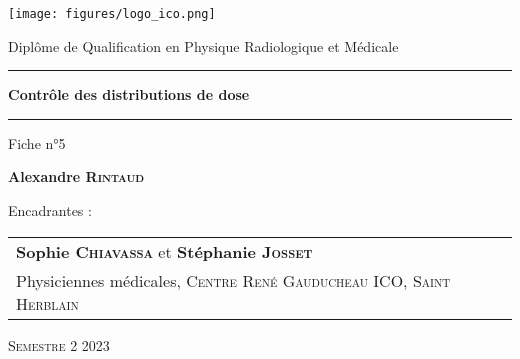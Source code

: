 \begin{titlepage}

    \unitlength 1cm
    \begin{center}
    
    \vspace*{1cm}

    \texttt{[image: figures/logo\_ico.png]}
    
    \vspace{2cm}
    
               {\Large Diplôme de Qualification en Physique Radiologique et Médicale\\}
               
    \vspace{2cm}           
    
    
    \rule{16cm}{0.7pt}
    
    \vspace{12pt}
               
               {\LARGE \bf Contrôle des distributions de dose\\}
               
    \vspace{12pt}
    \rule{16cm}{0.7pt}

    \vspace{2cm}

                {\large Fiche n°5}
    
    \vspace{1.5cm}

               {\Large\bf {Alexandre \textsc{Rintaud}}}
    
    \vspace{1.5cm}
    
    \end{center}
    
    Encadrantes :
    
    \small {
    \begin{tabular}{llr}\\
    \textbf{Sophie \textsc{Chiavassa}} et \textbf{Stéphanie \textsc{Josset}}  &  &  \\
      Physiciennes médicales, \textsc{Centre René Gauducheau ICO, Saint Herblain} &    &  \\
    
    \end{tabular}
    }

    \vspace{1.5cm}


    \begin{center}
    \textsc{Semestre 2 2023}
    \end{center}
    
\end{titlepage}
\let\cleardoublepage\clearpage
